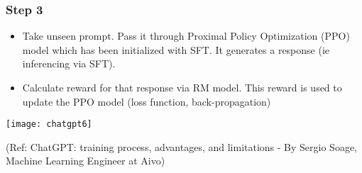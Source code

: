 			
			
			


\begin{frame}[fragile]\frametitle{Step 3}

\begin{itemize}
\item Take unseen prompt. Pass it through Proximal Policy Optimization (PPO) model which has been initialized with SFT. It generates a response (ie inferencing via SFT).
\item Calculate reward for that response via RM model. This reward is used to update the PPO model (loss function, back-propagation)
\end{itemize}	 

			\begin{center}
			\texttt{[image: chatgpt6]}
			
			\end{center}		
			
			{\tiny (Ref: ChatGPT: training process, advantages, and limitations - By Sergio Soage, Machine Learning Engineer at Aivo)}
			
\end{frame}


			
			
			

